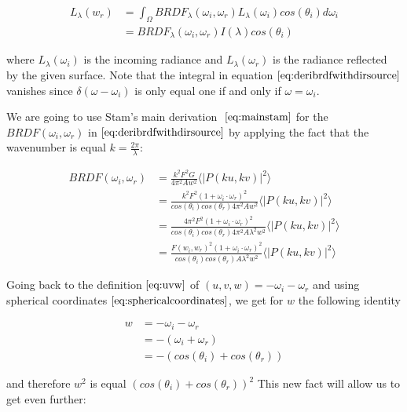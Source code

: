 \begin{align}
L_{\lambda}(w_r) 
& = \int_{\Omega} BRDF_{\lambda}(\omega_i, \omega_r) L_{\lambda}(\omega_i) cos(\theta_i) d\omega_i \nonumber \\
& = BRDF_{\lambda}(\omega_i, \omega_r) I(\lambda) cos(\theta_i)
\label{eq:deribrdfwithdirsource}
\end{align}

where $L_{\lambda}(\omega_i)$ is the incoming radiance and $L_{\lambda}(\omega_r)$ is the radiance reflected by the given surface. Note that the integral in equation $\ref{eq:deribrdfwithdirsource}$ vanishes since $\delta(\omega-\omega_i)$ is only equal one if and only if $\omega = \omega_i$.

We are going to use Stam's main derivation $~\eqref{eq:mainstam}$ for the $BRDF(\omega_i, \omega_r)$ in $\ref{eq:deribrdfwithdirsource}$ by applying the fact that the wavenumber is equal $k=\frac{2\pi}{\lambda}$:

\begin{align}
BRDF(\omega_i, \omega_r) 
& = \frac{k^2 F^2 G}{4\pi^2 A w^2} \langle \left|P(ku, kv) \right|^2\rangle \nonumber\\
& = \frac{k^2 F^2 (1 + \omega_i \cdot \omega_r)^2}{cos(\theta_i)cos(\theta_r) 4\pi^2 A w^2} \langle \left|P(ku, kv)  \right|^2\rangle \nonumber\\
& = \frac{4 \pi^2 F^2 (1 + \omega_i \cdot \omega_r)^2}{cos(\theta_i)cos(\theta_r) 4\pi^2 A \lambda^2 w^2} \langle \left|P(ku, kv)  \right|^2\rangle \nonumber\\
& = \frac{F(w_i, w_r)^2 (1 + \omega_i \cdot \omega_r)^2}{cos(\theta_i)cos(\theta_r) A \lambda^2 w^2} \langle \left|P(ku, kv)  \right|^2\rangle
\end{align}

Going back to the definition $\ref{eq:uvw}$ of $(u,v,w)= -\omega_i - \omega_r$ and using spherical coordinates $\ref{eq:sphericalcoordinates}$, we get for $w$ the following identity

\begin{align}
w 
&= -\omega_i - \omega_r \nonumber \\ 
&= -(\omega_i + \omega_r) \nonumber \\
&= -\left( cos(\theta_i)+cos(\theta_r) \right) 
\end{align}

and therefore $w^2$ is equal $(cos(\theta_i)+cos(\theta_r))^2$
This new fact will allow us to get even further:

